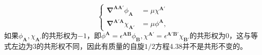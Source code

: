 \begin{equation*}
	\begin{cases}
		\mathbf{\nabla }^{\boldsymbol{AA} '} \phi _{\boldsymbol{A}} & =\mu \chi ^{\boldsymbol{A} '}\\
		\mathbf{\nabla }^{\boldsymbol{A} '\boldsymbol{A}} \chi _{\boldsymbol{A} '} & =\mu \phi ^{\boldsymbol{A}} ,
	\end{cases}
\end{equation*}
如果$\phi _{\boldsymbol{A}} ,\chi _{\boldsymbol{A} '}$的共形权为$-1$，即$\phi ^{\boldsymbol{A}} =\epsilon ^{\boldsymbol{AB}} \phi _{\boldsymbol{B}} ,\chi ^{\boldsymbol{A} '} =\epsilon ^{\boldsymbol{A} '\boldsymbol{B} '} \chi _{\boldsymbol{B} '}$的共形权为$0$，这与等式左边为$3$的共形权不同，因此有质量的自旋$1/2$方程4.38并不是共形不变的。



